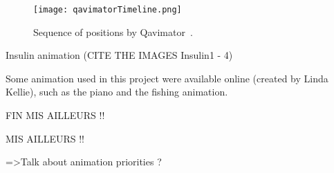 \begin{figure}[h]
  \caption{Sequence of positions by Qavimator~\cite{qavimatorWebsite}. }
  \centering
  \texttt{[image: qavimatorTimeline.png]}
  \label{qavimatorTimeline}
\end{figure}

Insulin animation (CITE THE IMAGES Insulin1 - 4)

Some animation used in this project were available online (created by Linda Kellie), such as the piano and the fishing animation.

FIN MIS AILLEURS !!
\fi



MIS AILLEURS !!
\iffalse

The main animation built for this project was the one used to inject insulin. The first frame is a movement that involves the right collar, shoulder and forearm to move the insulin carried by the right hand into a correct position to begin the injection. The second frame sets the correct position for the right thight were insulin will be injected, and change the adomen and chest position to make the avatar lean forward. Next movement is to make the avatar look at his tight, while the arm comes down to put the needle into the thigh and without moving during 10 seconds, as required for an insulin injection.

FIN MIS AILLEURS !!
\fi


=>Talk about animation priorities ? 

